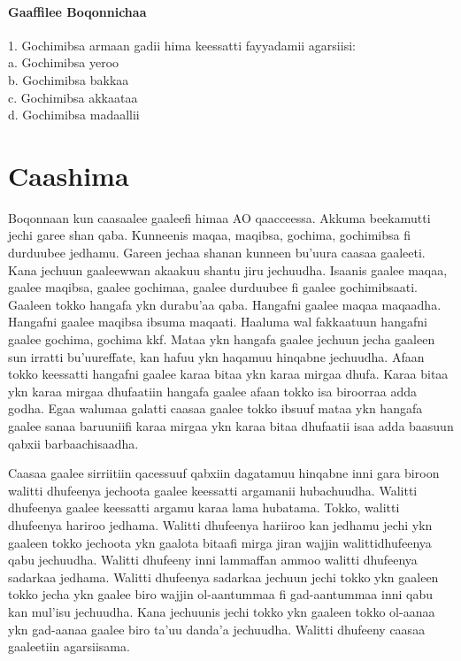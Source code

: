 \documentclass[11pt,b5paper]{book}
\begin{document}
\subsubsection{Gaaffilee Boqonnichaa}
1. Gochimibsa armaan gadii hima keessatti fayyadamii agarsiisi:\\
a. Gochimibsa yeroo\\
b. Gochimibsa bakkaa\\
c. Gochimibsa akkaataa\\
d. Gochimibsa madaallii\\

\newpage

\chapter{Caashima}
Boqonnaan kun caasaalee gaaleefi himaa AO qaacceessa. Akkuma beekamutti jechi garee shan qaba. Kunneenis maqaa, maqibsa, gochima, gochimibsa fi durduubee jedhamu. Gareen jechaa shanan kunneen bu’uura caasaa gaaleeti. Kana jechuun gaaleewwan akaakuu shantu jiru jechuudha. Isaanis gaalee maqaa, gaalee maqibsa, gaalee gochimaa, gaalee durduubee fi gaalee gochimibsaati. Gaaleen tokko hangafa ykn durabu’aa qaba. Hangafni gaalee maqaa maqaadha. Hangafni gaalee maqibsa ibsuma maqaati. Haaluma wal fakkaatuun hangafni gaalee gochima, gochima kkf. Mataa ykn hangafa gaalee jechuun jecha gaaleen sun irratti bu’uureffate, kan hafuu ykn haqamuu hinqabne jechuudha. Afaan tokko keessatti hangafni gaalee karaa bitaa ykn karaa mirgaa dhufa. Karaa bitaa ykn karaa mirgaa dhufaatiin hangafa gaalee afaan tokko isa biroorraa adda godha. Egaa walumaa galatti caasaa gaalee tokko ibsuuf mataa ykn hangafa gaalee sanaa baruuniifi karaa mirgaa ykn karaa bitaa dhufaatii isaa adda baasuun qabxii barbaachisaadha.

Caasaa gaalee sirriitiin qacessuuf qabxiin dagatamuu hinqabne inni gara biroon walitti dhufeenya jechoota gaalee keessatti argamanii hubachuudha. Walitti dhufeenya gaalee keessatti argamu karaa lama hubatama. Tokko, walitti dhufeenya hariroo jedhama. Walitti dhufeenya hariiroo kan jedhamu jechi ykn gaaleen tokko jechoota ykn gaalota bitaafi mirga jiran wajjin walittidhufeenya qabu jechuudha. Walitti dhufeeny inni lammaffan ammoo walitti dhufeenya sadarkaa jedhama. Walitti dhufeenya sadarkaa jechuun jechi tokko ykn gaaleen tokko
jecha ykn gaalee biro wajjin ol-aantummaa fi gad-aantummaa inni qabu kan mul’isu jechuudha. Kana jechuunis jechi tokko ykn gaaleen tokko ol-aanaa ykn gad-aanaa gaalee biro ta’uu danda’a jechuudha. Walitti dhufeeny caasaa gaaleetiin agarsiisama. 
\end{document}
